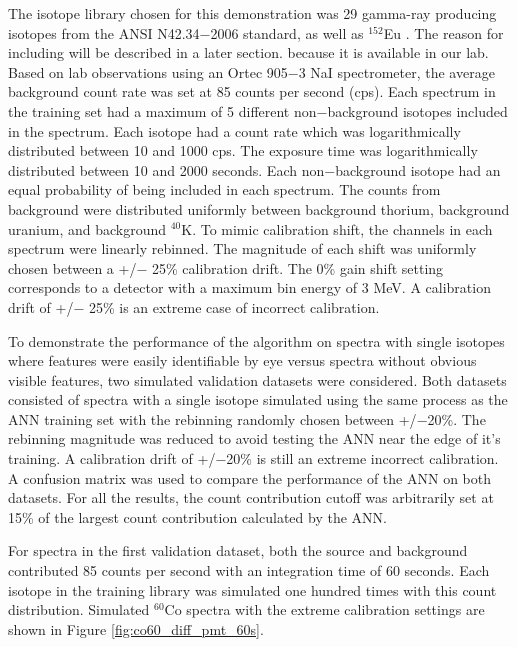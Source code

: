 \documentclass[tocnosub,noragright,centerchapter,12pt,fullpage]{uiucecethesis09}
\begin{document}
The isotope library chosen for this demonstration was 29 gamma-ray producing isotopes from the ANSI N42.34$-$2006 standard, as well as $^{152}$Eu \cite{ANSI}. The reason for including will be described in a later section. because it is available in our lab. Based on lab observations using an Ortec 905$-$3 NaI spectrometer, the average background count rate was set at 85 counts per second (cps). Each spectrum in the training set had a maximum of 5 different non$-$background isotopes included in the spectrum. Each isotope had a count rate which was logarithmically distributed between 10 and 1000 cps. The exposure time was logarithmically distributed between 10 and 2000 seconds. Each non$-$background isotope had an equal probability of being included in each spectrum. The counts from background were distributed uniformly between background thorium, background uranium, and background $^{40}$K. To mimic calibration shift, the channels in each spectrum were linearly rebinned. The magnitude of each shift was uniformly chosen between a +/$-$ 25\% calibration drift. The 0\% gain shift setting corresponds to a detector with a maximum bin energy of 3 MeV. A calibration drift of +/$-$ 25\% is an extreme case of incorrect calibration.

To demonstrate the performance of the algorithm on spectra with single isotopes where features were easily identifiable by eye versus spectra without obvious visible features, two simulated validation datasets were considered. Both datasets consisted of spectra with a single isotope simulated using the same process as the ANN training set with the rebinning randomly chosen between +/$-$20\%. The rebinning magnitude was reduced to avoid testing the ANN near the edge of it's training. A calibration drift of +/$-$20\% is still an extreme incorrect calibration. A confusion matrix was used to compare the performance of the ANN on both datasets. For all the results, the count contribution cutoff was arbitrarily set at 15\% of the largest count contribution calculated by the ANN.


For spectra in the first validation dataset, both the source and background contributed 85 counts per second with an integration time of 60 seconds. Each isotope in the training library was simulated one hundred times with this count distribution. Simulated $^{60}$Co spectra with the extreme calibration settings are shown in Figure \ref{fig:co60_diff_pmt_60s}.
\end{document}
